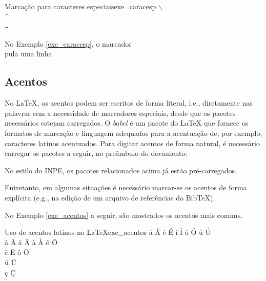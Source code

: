\begin{texexptitled}[breakable,center lower,enhanced,middle=2mm,listing side text]{Marcação para caracteres especiais}{exe_caracesp}
$\backslash$ \\
\^{} \\
\texttt{\~{}}
\end{texexptitled}

\begin{marker}
  No Exemplo \ref{exe_caracesp}, o marcador \texttt{\\} pula uma linha.
\end{marker}

\subsection{Acentos}
\label{sec:acentos}

No LaTeX, os acentos podem ser escritos de forma literal, i.e., diretamente nas palavras sem a necessidade de marcadores especiais, desde que os pacotes necessários estejam carregados. O \textit{babel} é um pacote do LaTeX que fornece os formatos de marcação e linguagem adequados para a acentuação de, por exemplo, caracteres latinos acentuados. Para digitar acentos de forma natural, é necessário carregar os pacotes a seguir, no preâmbulo do documento:

\begin{itemize}
    \item \texttt{\usepackage[brazilian]{babel}}
    \item \texttt{\usepackage[utf8]{inputenc}}
    \item \texttt{\usepackage[T1]{fontenc}}
\end{itemize}

\begin{marker}
  No estilo do INPE, os pacotes relacionados acima já estão pré-carregados.
\end{marker}

Entretanto, em algumas situações é necessário marcar-se os acentos de forma explícita (e.g., na edição de um arquivo de referências do BibTeX).

No Exemplo \ref{exe_acentos} a seguir, são mostrados os acentos mais comuns.

\begin{texexptitled}[breakable,center lower,enhanced,middle=2mm,listing side text]{Uso de acentos latinos no LaTeX}{exe_acentos}
\'a \'A \'e \'E \'i \'I \'o \'O \'u \'U
\\
\^a \^A \~a \~A \`a \`A \~o \~O
\\
\^e \^E \^o \^O
\\
\"u \"U
\\
\c{c} \c{C}
\end{texexptitled}

